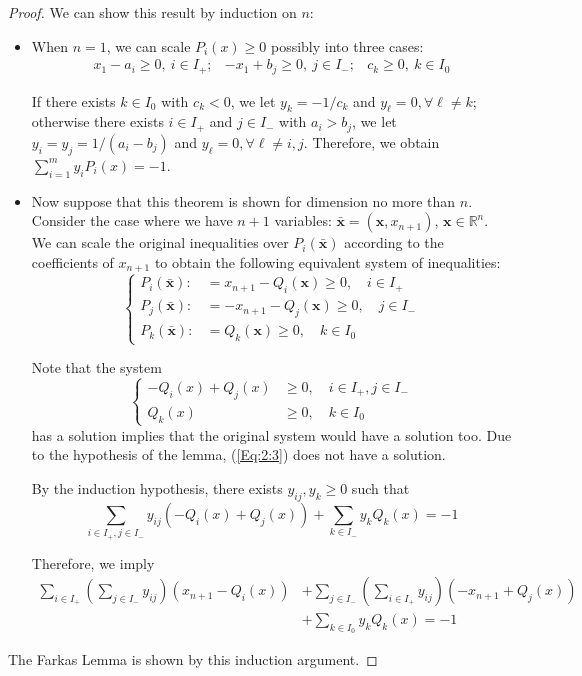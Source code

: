 \begin{proof}
We can show this result by induction on $n$:
\begin{itemize}
\item
When $n=1$, we can scale $P_i(x)\ge0$ possibly into three cases:
\[
\begin{array}{lll}
x_1-a_i\ge0,\ i\in I_+;
&
-x_1+b_j\ge0,\ j\in I_-;
&
c_k\ge0, \ k\in I_0
\end{array}
\]

If there exists $k\in I_0$ with $c_k<0$, we let $y_k = -1/c_k$ and $y_\ell = 0,\forall \ell\ne k$; otherwise there exists $i\in I_+$ and $j\in I_-$ with $a_i>b_j$, we let $y_i=y_j=1/(a_i-b_j)$ and $y_\ell =0,\forall \ell\ne i,j$. Therefore, we obtain $\sum_{i=1}^my_iP_i(x)=-1$.
\item
Now suppose that this theorem is shown for dimension no more than $n$. Consider the case where we have $n+1$ variables: $\bar{\bm x} = (\bm x,x_{n+1})$, $\bm x\in\mathbb{R}^n$.
We can scale the original inequalities over $P_i(\bar{\bm x})$ according to the coefficients of $x_{n+1}$ to obtain the following equivalent system of inequalities:
\begin{equation}
\left\{
\begin{aligned}
P_i(\bar{\bm x}):&=x_{n+1} - Q_i(\bm x)\ge0,\quad i\in I_+\\
P_j(\bar{\bm x}):&=-x_{n+1} - Q_j(\bm x)\ge0,\quad j\in I_-\\
P_k(\bar{\bm x}):&=Q_k(\bm x)\ge0,\quad k\in I_0
\end{aligned}
\right.
\end{equation}

Note that the system
\begin{equation}\label{Eq:2:3}
\left\{
\begin{aligned}
-Q_i(x)+Q_j(x)&\ge0,\quad i\in I_+,j\in I_-\\
Q_k(x)&\ge0,\quad k\in I_0
\end{aligned}
\right.
\end{equation}
has a solution implies that the original system would have a solution too. 
Due to the hypothesis of the lemma, (\ref{Eq:2:3}) does not have a solution.

By the induction hypothesis, there exists $y_{ij},y_k\ge0$ such that
\[
\sum_{i\in I_+, j\in I_-}y_{ij}(-Q_i(x) + Q_j(x)) + \sum_{k\in I_-}y_kQ_k(x)=-1
\]

Therefore, we imply
\begin{align*}
\sum_{i\in I_+}\left(\sum_{j\in I_-}y_{ij}\right)(x_{n+1} - Q_i(x))&
+
\sum_{j\in I_-}\left(\sum_{i\in I_+}y_{ij}\right)(-x_{n+1} + Q_j(x))\\
&+
\sum_{k\in I_0}y_kQ_k(x)=-1
\end{align*}

\end{itemize}
The Farkas Lemma is shown by this induction argument.
\end{proof}

